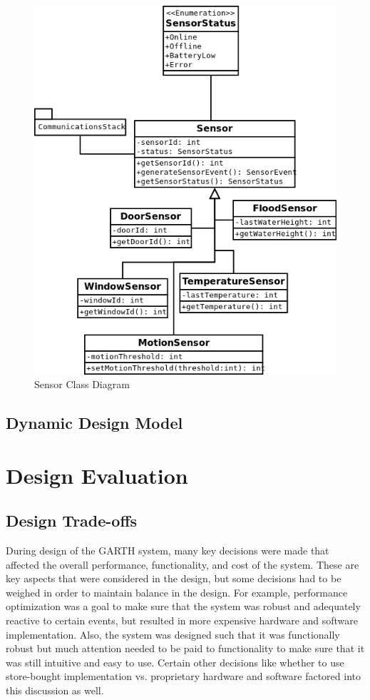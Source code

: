 \documentclass{report}
\begin{document}
\begin{figure}[p]
    \centering
    \label{fig:sensor_class_diagram}
    \caption{Sensor Class Diagram}
    \includegraphics[scale=0.5]{sensor_class_diagram}
\end{figure}

\section{Dynamic Design Model}

\chapter{Design Evaluation} %
\label{ch:design-evaluation}

\section{Design Trade-offs}

During design of the GARTH system, many key decisions were made that affected
the overall performance, functionality, and cost of the system. These are key
aspects that were considered in the design, but some decisions had to be
weighed in order to maintain balance in the design. For example, performance
optimization was a goal to make sure that the system was robust and adequately
reactive to certain events, but resulted in more expensive hardware and
software implementation. Also, the system was designed such that it was
functionally robust but much attention needed to be paid to functionality to
make sure that it was still intuitive and easy to use. Certain other decisions
like whether to use store-bought implementation vs. proprietary hardware and
software factored into this discussion as well.
\end{document}
